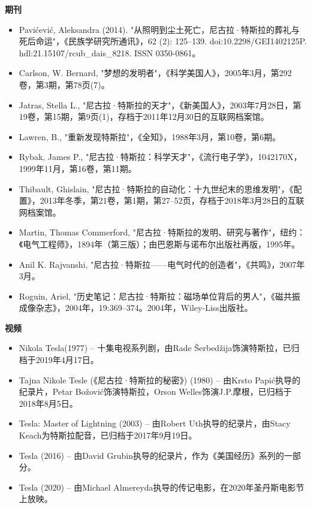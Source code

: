 \textbf{期刊}
\begin{itemize}
\item Pavićević, Aleksandra (2014). "从照明到尘土死亡，尼古拉·特斯拉的葬礼与死后命运"，《民族学研究所通讯》，62 (2): 125–139. doi:10.2298/GEI1402125P. hdl:21.15107/rcub_dais_8218. ISSN 0350-0861。
\item Carlson, W. Bernard, "梦想的发明者"，《科学美国人》，2005年3月，第292卷，第3期，第78页(7)。
\item Jatras, Stella L., "尼古拉·特斯拉的天才"，《新美国人》，2003年7月28日，第19卷，第15期，第9页(1)，存档于2011年12月30日的互联网档案馆。
\item Lawren, B., "重新发现特斯拉"，《全知》，1988年3月，第10卷，第6期。
\item Rybak, James P., "尼古拉·特斯拉：科学天才"，《流行电子学》，1042170X，1999年11月，第16卷，第11期。
\item Thibault, Ghislain, "尼古拉·特斯拉的自动化：十九世纪末的思维发明"，《配置》，2013年冬季，第21卷，第1期，第27–52页，存档于2018年3月28日的互联网档案馆。
\item Martin, Thomas Commerford, "尼古拉·特斯拉的发明、研究与著作"，纽约：《电气工程师》，1894年（第三版）；由巴恩斯与诺布尔出版社再版，1995年。
\item Anil K. Rajvanshi, "尼古拉·特斯拉——电气时代的创造者"，《共鸣》，2007年3月。
\item Roguin, Ariel, "历史笔记：尼古拉·特斯拉：磁场单位背后的男人"，《磁共振成像杂志》，2004年，19:369–374。2004年，Wiley-Liss出版社。
\end{itemize}
\textbf{视频}
\begin{itemize}
\item Nikola Tesla(1977) – 十集电视系列剧，由Rade Šerbedžija饰演特斯拉，已归档于2019年4月17日。
\item Tajna Nikole Tesle (《尼古拉·特斯拉的秘密》) (1980) – 由Krsto Papić执导的纪录片，Petar Božović饰演特斯拉，Orson Welles饰演J.P.摩根，已归档于2018年8月5日。
\item Tesla: Master of Lightning (2003) – 由Robert Uth执导的纪录片，由Stacy Keach为特斯拉配音，已归档于2017年9月19日。
\item Tesla (2016) – 由David Grubin执导的纪录片，作为《美国经历》系列的一部分。
\item Tesla (2020) – 由Michael Almereyda执导的传记电影，在2020年圣丹斯电影节上放映。
\end{itemize}
